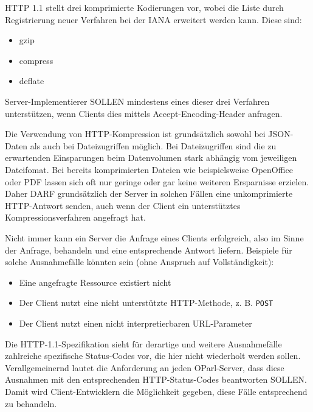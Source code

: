 \documentclass[,a4paper]{article}
\begin{document}
HTTP 1.1 stellt drei komprimierte Kodierungen vor, wobei die Liste durch
Registrierung neuer Verfahren bei der IANA erweitert werden kann. Diese
sind:

\begin{itemize}
\itemsep1pt\parskip0pt
\item
  gzip
\item
  compress
\item
  deflate
\end{itemize}

Server-Implementierer SOLLEN mindestens eines dieser drei Verfahren
unterstützen, wenn Clients dies mittels Accept-Encoding-Header anfragen.

Die Verwendung von HTTP-Kompression ist grundsätzlich sowohl bei
JSON-Daten als auch bei Dateizugriffen möglich. Bei Dateizugriffen sind
die zu erwartenden Einsparungen beim Datenvolumen stark abhängig vom
jeweiligen Dateifomat. Bei bereits komprimierten Dateien wie
beispielsweise OpenOffice oder PDF lassen sich oft nur geringe oder gar
keine weiteren Ersparnisse erzielen. Daher DARF grundsätzlich der Server
in solchen Fällen eine unkomprimierte HTTP-Antwort senden, auch wenn der
Client ein unterstütztes Kompressionsverfahren angefragt hat.


Nicht immer kann ein Server die Anfrage eines Clients erfolgreich, also
im Sinne der Anfrage, behandeln und eine entsprechende Antwort liefern.
Beispiele für solche Ausnahmefälle könnten sein (ohne Anspruch auf
Vollständigkeit):

\begin{itemize}
\item
  Eine angefragte Ressource existiert nicht
\item
  Der Client nutzt eine nicht unterstützte HTTP-Methode, z. B.
  \texttt{POST}
\item
  Der Client nutzt einen nicht interpretierbaren URL-Parameter
\end{itemize}

Die HTTP-1.1-Spezifikation sieht für derartige und weitere Ausnahmefälle
zahlreiche spezifische Status-Codes vor, die hier nicht wiederholt
werden sollen. Verallgemeinernd lautet die Anforderung an jeden
OParl-Server, dass diese Ausnahmen mit den entsprechenden
HTTP-Status-Codes beantworten SOLLEN. Damit wird Client-Entwicklern die
Möglichkeit gegeben, diese Fälle entsprechend zu behandeln.
\end{document}
